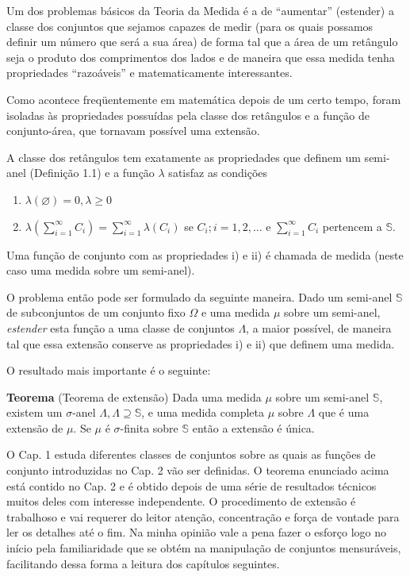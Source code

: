 \documentclass[
]{book}
\begin{document}
Um dos problemas básicos da Teoria da Medida é a de ``aumentar'' (estender) a classe dos conjuntos que sejamos capazes de medir (para os quais possamos definir um número que será a sua área) de forma tal que a área de um retângulo seja o produto dos comprimentos dos lados e de maneira que essa medida tenha propriedades ``razoáveis'' e matematicamente interessantes.

Como acontece freqüentemente em matemática depois de um certo tempo, foram isoladas às propriedades possuídas pela classe dos retângulos e a função de conjunto-área, que tornavam possível uma extensão.

A classe dos retângulos tem exatamente as propriedades que definem um semi-anel (Definição 1.1) e a função \(\lambda\) satisfaz as condições

\begin{enumerate}
\def\labelenumi{\roman{enumi})}
\item
  \(\lambda(\varnothing) = 0, \lambda \ge 0\)
\item
  \(\lambda\left(\sum\limits_{i=1}^\infty C_i\right) = \sum\limits_{i=1}^\infty \lambda(C_i)\) se \(C_i; i=1, 2, \dots\) e \(\sum\limits_{i=1}^\infty C_i\) pertencem a \(\mathbb{S}\).
\end{enumerate}

Uma função de conjunto com as propriedades i) e ii) é chamada de medida (neste caso uma medida sobre um semi-anel).

O problema então pode ser formulado da seguinte maneira. Dado um semi-anel \(\mathbb{S}\) de subconjuntos de um conjunto fixo \(\Omega\) e uma medida \(\mu\) sobre um semi-anel, \emph{estender} esta função a uma classe de conjuntos \(\Lambda\), a maior possível, de maneira tal que essa extensão conserve as propriedades i) e ii) que definem uma medida.

O resultado mais importante é o seguinte:

\textbf{Teorema} (Teorema de extensão) Dada uma medida \(\mu\) sobre um semi-anel \(\mathbb{S}\), existem um \(\sigma\)-anel \(\Lambda, \Lambda \supseteq \mathbb{S}\), e uma medida completa \(\mu\) sobre \(\Lambda\) que é uma extensão de \(\mu\). Se \(\mu\) é \(\sigma\)-finita sobre \(\mathbb{S}\) então a extensão é única.

O Cap. 1 estuda diferentes classes de conjuntos sobre as quais as funções de conjunto introduzidas no Cap. 2 vão ser definidas. O teorema enunciado acima está contido no Cap. 2 e é obtido depois de uma série de resultados técnicos muitos deles com interesse independente. O procedimento de extensão é trabalhoso e vai requerer do leitor atenção, concentração e força de vontade para ler os detalhes até o fim. Na minha opinião vale a pena fazer o esforço logo no início pela familiaridade que se obtém na manipulação de conjuntos mensuráveis, facilitando dessa forma a leitura dos capítulos seguintes.
\end{document}
